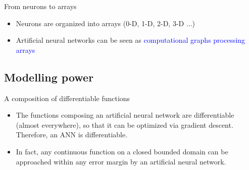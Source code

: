 \documentclass[xcolor=pdftex,dvipsnames,table,mathserif]{beamer}
\begin{document}
\begin{frame}{From neurons to arrays}

  \begin{itemize}
  \item Neurons are organized into arrays (0-D, 1-D, 2-D, 3-D ...)
  \item Artificial neural networks can be seen as \textcolor{blue}{computational graphs processing arrays}
  \end{itemize}

\end{frame}

\subsection{Modelling power}


\begin{frame}{A composition of differentiable functions}

  \begin{itemize}
  \item The functions composing an artificial neural network are differentiable (almost everywhere), so that it can be optimized via gradient descent. Therefore, an ANN is differentiable.
  \item In fact, any continuous function on a closed bounded domain can be approached within any error margin by an artificial neural network.

  \end{itemize}

\end{frame}
\end{document}
